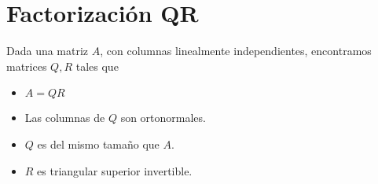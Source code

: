 \documentclass{./Geometria.tex}
\begin{document}
\section{Factorización QR}
Dada una matriz \(A\), con columnas linealmente independientes, encontramos matrices
\(Q,R\) tales que
\begin{itemize}
    \item \(A=QR\)
    \item Las columnas de \(Q\) son ortonormales.
    \item \(Q\) es del mismo tamaño que \(A\).
    \item \(R\) es triangular superior invertible.
\end{itemize}
\end{document}
